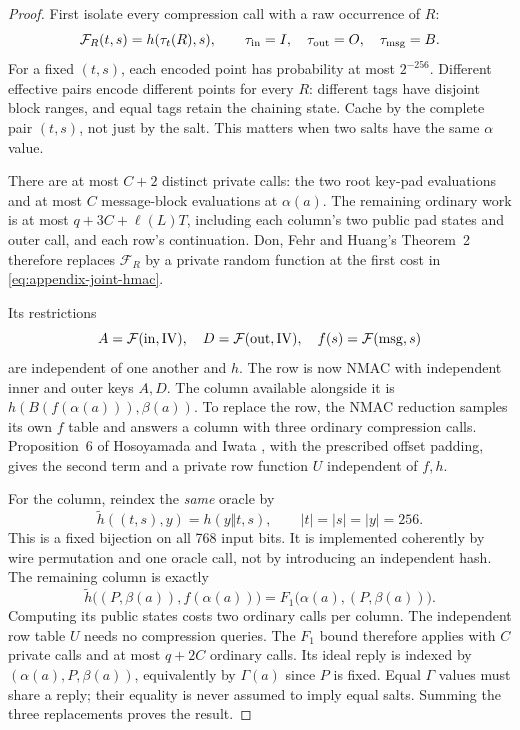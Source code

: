 \begin{proof}
First isolate every compression call with a raw occurrence of $R$:
\[
 \mathcal F_R(t,s)=h(\tau_t(R),s),
 \qquad \tau_{\rm in}=I,\quad\tau_{\rm out}=O,\quad\tau_{\rm msg}=B.
\]
For a fixed $(t,s)$, each encoded point has probability at most $2^{-256}$.
Different effective pairs encode different points for every $R$:
different tags have disjoint block ranges, and equal tags retain the
chaining state. Cache by the complete pair $(t,s)$, not just by the salt.
This matters when two salts have the same $\alpha$ value.

There are at most $C+2$ distinct private calls: the two root key-pad
evaluations and at most $C$ message-block evaluations at $\alpha(a)$.
The remaining ordinary work is at most $q+3C+\ell(L)T$, including each
column's two public pad states and outer call, and each row's continuation.
Don, Fehr and Huang's Theorem~2~\cite{dfh2022} therefore replaces
$\mathcal F_R$ by a private random function at the first cost in
\eqref{eq:appendix-joint-hmac}.

Its restrictions
\[
 A=\mathcal F({\rm in},\mathrm{IV}),\quad
 D=\mathcal F({\rm out},\mathrm{IV}),\quad
 f(s)=\mathcal F({\rm msg},s)
\]
are independent of one another and $h$. The row is now NMAC with independent
inner and outer keys $A,D$. The column available alongside it is
$h(B(f(\alpha(a))),\beta(a))$. To replace the row, the NMAC reduction
samples its own $f$ table and answers a column with three ordinary
compression calls. Proposition~6 of Hosoyamada and Iwata
\cite{hmacqrom2021}, with the prescribed offset padding, gives the second
term and a private row function $U$ independent of $f,h$.

For the column, reindex the \emph{same} oracle by
\[
 \widetilde h((t,s),y)=h(y\Vert t,s),
 \qquad |t|=|s|=|y|=256.
\]
This is a fixed bijection on all 768 input bits. It is implemented
coherently by wire permutation and one oracle call, not by introducing an
independent hash. The remaining column is exactly
\[
 \widetilde h\bigl((P,\beta(a)),f(\alpha(a))\bigr)
   =F_1\bigl(\alpha(a),(P,\beta(a))\bigr).
\]
Computing its public states costs two ordinary calls per column. The
independent row table $U$ needs no compression queries.
The $F_1$ bound therefore applies with $C$ private calls and at most
$q+2C$ ordinary calls. Its ideal reply is indexed by
$(\alpha(a),P,\beta(a))$, equivalently by $\Gamma(a)$ since $P$ is fixed.
Equal $\Gamma$ values must share a reply; their equality is never assumed
to imply equal salts. Summing the three replacements proves the result.
\end{proof}

